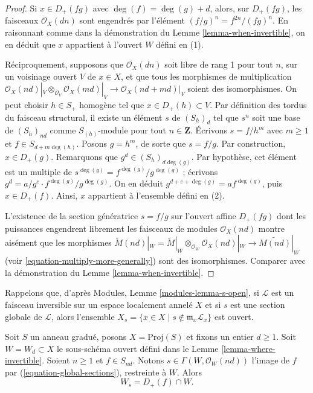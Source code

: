 \begin{proof}
Si $x \in D_{+}(fg)$ avec $\deg(f) = \deg(g) + d$, alors, sur
$D_{+}(fg)$, les faisceaux $\mathcal{O}_X(dn)$ sont engendrés par l'élément
$(f/g)^n = f^{2n}/(fg)^n$. En raisonnant comme dans la démonstration du
Lemme \ref{lemma-when-invertible}, on en déduit que $x$ appartient à l'ouvert
$W$ défini en (1).

\medskip\noindent
Réciproquement, supposons que $\mathcal{O}_X(dn)$ soit libre de rang 1 pour
tout $n$, sur un voisinage ouvert $V$ de
$x \in X$, et que tous les morphismes
de multiplication
$\mathcal{O}_X(nd)|_V \otimes_{\mathcal{O}_V} \mathcal{O}_X(md)|_V
\to \mathcal{O}_X(nd + md)|_V$ soient des isomorphismes.
On peut choisir $h \in S_{+}$ homogène tel que
$x \in D_{+}(h) \subset V$. Par définition
des tordus du faisceau structural,
il existe un élément $s$ de $(S_h)_d$ tel que $s^n$ soit une base de
$(S_h)_{nd}$ comme $S_{(h)}$-module pour tout $n \in \mathbf{Z}$.
Écrivons $s = f/h^m$ avec $m \geq 1$ et
$f \in S_{d + m \deg(h)}$. Posons $g = h^m$, de sorte que $s = f/g$.
Par construction, $x \in D_{+}(g)$. Remarquons que
$g^d \in (S_h)_{d\deg(g)}$. Par hypothèse, cet élément est un multiple de
$s^{\deg(g)} = f^{\deg(g)}/g^{\deg(g)}$ ; écrivons
$g^d = a/g^e \cdot f^{\deg(g)}/g^{\deg(g)}$. On en déduit
$g^{d + e + \deg(g)} = a f^{\deg(g)}$, puis $x \in D_{+}(f)$.
Ainsi, $x$ appartient à l'ensemble défini en (2).

\medskip\noindent
L'existence de la section génératrice $s = f/g$ sur l'ouvert affine
$D_{+}(fg)$ dont les puissances engendrent
librement les faisceaux de modules
$\mathcal{O}_X(nd)$ montre aisément que les morphismes
$\widetilde M(nd)|_W = \widetilde M|_W \otimes_{\mathcal{O}_W}
\mathcal{O}_X(nd)|_W \to \widetilde{M(nd)}|_W$
(voir \ref{equation-multiply-more-generally}) sont des isomorphismes.
Comparer avec la démonstration du Lemme \ref{lemma-when-invertible}.
\end{proof}

\noindent
Rappelons que, d'après Modules, Lemme \ref{modules-lemma-s-open}, si
$\mathcal{L}$ est un faisceau inversible
sur un espace localement annelé $X$
et si $s$ est une section globale de $\mathcal{L}$, alors l'ensemble
$X_s = \{x \in X \mid s \not \in \mathfrak m_x\mathcal{L}_x\}$ est ouvert.

\begin{lemma}
\label{lemma-principal-open}
Soit $S$ un anneau gradué, posons $X = \text{Proj}(S)$ et fixons un entier
$d \geq 1$. Soit $W = W_d \subset X$ le sous-schéma ouvert défini dans le
Lemme \ref{lemma-where-invertible}. Soient $n \geq 1$ et $f \in S_{nd}$.
Notons $s \in \Gamma(W, \mathcal{O}_W(nd))$ l'image de $f$ par
(\ref{equation-global-sections}), restreinte à $W$. Alors
$$
W_s = D_{+}(f) \cap W.
$$
\end{lemma}


